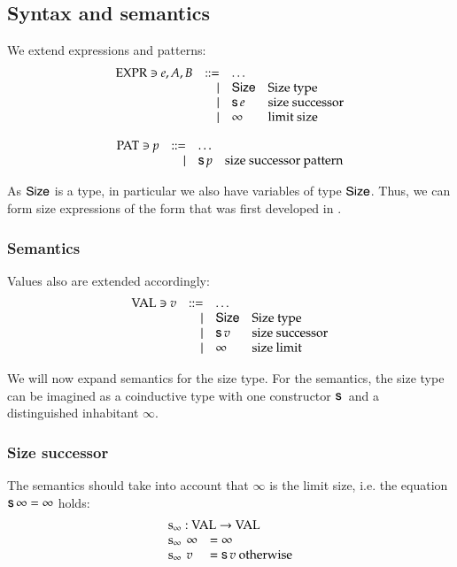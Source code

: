 \subsection{Syntax and semantics}

We extend expressions and patterns:
\[
\begin{array}{lrll}
\operatorname{EXPR} \ni e,A,B & ::= & \ldots & \\
& \mid & \mathsf{Size} & \mbox{Size type} \\
& \mid & \mathsf{s}\, e  & \mbox{size successor}\\ 
& \mid & \infty & \mbox{limit size}\\
\end{array}
\]

\[
\begin{array}{lrll}
\operatorname{PAT} \ni p & ::= & \ldots & \\
& \mid & \mathsf{s}\, p & \mbox{size successor pattern}\\
\end{array}
\]

As $\mathsf{Size}$ is a type, in particular we also have variables of type $\mathsf{Size}$.
Thus, we can form size expressions of the form that was first developed in \cite{bgp:lpar06}.


\subsubsection{Semantics}

Values also are extended accordingly:
\[
\begin{array}{lrll}
\operatorname{VAL} \ni v & ::= & \ldots & \\
& \mid & \mathsf{Size} & \mbox{Size type}\\
& \mid & \mathsf{s}\, v & \mbox{size successor}\\
& \mid & \infty & \mbox{size limit}\\
\end{array}
\]

We will now expand semantics for the size type. For the semantics, the size type can be imagined as a coinductive type with one constructor $\mathsf{s}\,$ and a distinguished inhabitant $\infty$.

\subsubsection{Size successor}
The semantics should take into account that $\infty$ is the limit size, i.e. the equation $\mathsf{s}\, \infty = \infty$ holds:
\[
\begin{array}[t]{ll}
\multicolumn{2}{l}{\sinfty : \Val \ra \Val}\\ 
\sinfty \: \infty & = \infty\\
\sinfty \:  v & = \s v  \mbox{ otherwise}\\ 
\end{array}
\]

